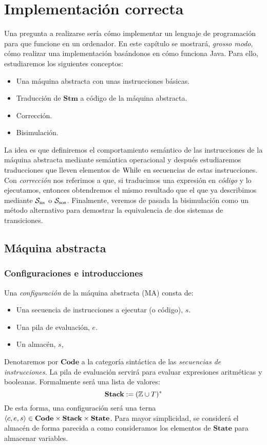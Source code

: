 \cleardoublepage
\chapter{Implementación correcta}
Una pregunta a realizarse sería cómo implementar un lenguaje de programación para que funcione en un ordenador. En este capítulo se mostrará, \textit{grosso modo}, cómo realizar una implementación basándonos en cómo funciona Java. Para ello, estudiaremos los siguientes conceptos:
\begin{itemize}
    \item Una máquina abstracta con unas instrucciones básicas.
    \item Traducción de $\mathbf{Stm}$ a código de la máquina abstracta.
    \item Corrección.
    \item Bisimulación.
\end{itemize}

La idea es que definiremos el comportamiento semántico de las instrucciones de la máquina abstracta mediante semántica operacional y después estudiaremos traducciones que lleven elementos de $\mathrm{While}$ en secuencias de estas instrucciones. Con \textit{corrección} nos referimos a que, si traducimos una expresión en \textit{código} y lo ejecutamos, entonces obtendremos el mismo resultado que el que ya describimos mediante $\mathcal{S}_{\mathrm{ns}}$ o $\mathcal{S}_{\mathrm{sos}}$. Finalmente, veremos de pasada la bisimulación como un método alternativo para demostrar la equivalencia de dos sistemas de transiciones.

\section{Máquina abstracta}


\subsection{Configuraciones e introducciones}

Una \textit{configuración} de la máquina abstracta (MA) consta de:
\begin{itemize}
    \item Una secuencia de instrucciones a ejecutar (o código), $s$.
    \item Una pila de evaluación, $e$.
    \item Un almacén, $s$,
\end{itemize}
Denotaremos por $\mathbf{Code}$ a la categoría sintáctica de las \textit{secuencias de instrucciones}. La pila de evaluación servirá para evaluar expresiones aritméticas y booleanas. Formalmente será una lista de valores:
\[
    \textbf{Stack} := (\mathbb{Z}\cup T)^*
\]
De esta forma, una configuración será una terna $\langle c, e, s \rangle \in \textbf{Code}\times\textbf{Stack} \times \textbf{State}$. Para mayor simplicidad, se considerá el almacén de forma parecida a como consideramos los elementos de $\textbf{State}$ para almacenar variables.
\\

